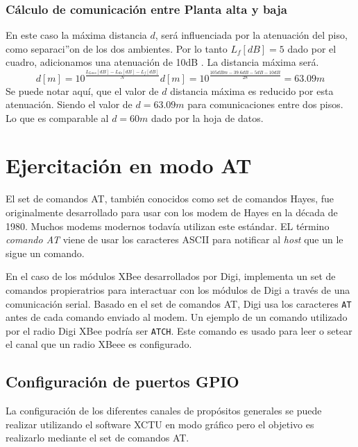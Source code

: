 \documentclass[11pt,oneside,spanish,a4paper]{article}
\begin{document}
\subsubsection{C\'alculo de comunicaci\'on entre Planta alta y baja}
En este caso la m\'axima distancia $d$, ser\'a influenciada por la atenuaci\'on del piso, como separaci''on de los dos ambientes. Por lo tanto $L_{f}[dB]=5$ dado por el cuadro, adicionamos una atenuaci\'on de 10dB . La distancia m\'axima ser\'a.
\begin{equation*}
\label{eq:calculod}
d[m] = 10 ^{\frac{L_{Loss}[dB] - L_{do}[dB] - L_{f}[dB]}{N}} 
d[m] = 10 ^{\frac{105dBm - 39.6dB - 5dB -10dB}{28}} = 63.09m
\end{equation*}
Se puede notar aqu\'i, que el valor de $d$ distancia m\'axima es reducido por esta atenuaci\'on. Siendo el valor de $d=63.09m$ para comunicaciones entre dos pisos. Lo que es comparable al $d=60m$ dado por la hoja de datos.

\section{Ejercitación en modo AT}
\label{sec:AT}

El set de comandos AT, también conocidos como set de comandos Hayes,
fue originalmente desarrollado para usar con los modem de Hayes en la
década de 1980. Muchos modems modernos todavía utilizan este
estándar. EL término \emph{comando AT}  viene de usar los caracteres
ASCII para notificar al \textsl{host}  que un le sigue un comando. 

En el caso de los módulos XBee desarrollados por Digi, implementa un
set de comandos propieratrios para interactuar con los módulos de
Digi a través de una comunicación serial. Basado en el set de comandos
AT, Digi usa los caracteres \texttt{AT} antes de cada comando enviado
al modem. Un ejemplo de un comando utilizado por el radio Digi XBee
podría ser \texttt{ATCH}. Este comando es usado para leer o setear el
canal que un radio XBeee es configurado\cite{at-cmds}.

\subsection{Configuración de puertos GPIO}
\label{sec:config-at}

La configuración de los diferentes canales de propósitos generales se
puede realizar utilizando el software XCTU en modo gráfico pero el
objetivo es realizarlo mediante el set de comandos AT. 
\end{document}
